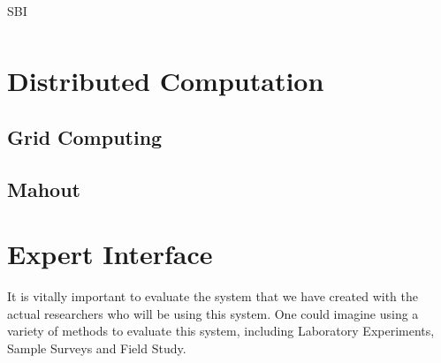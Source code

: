 \documentclass[12pt,oneside]{book}
\begin{document}
\begin{table}
\begin{tabular}{|l|l|l|}
\hline

\hline


\hline
\end{tabular}
\caption{SBI}
\label{table:obvSBI}
\end{table}

%
%




%
%





%
%





%
%




%
%





%
%





%
%









\section{Distributed Computation}




\subsection{Grid Computing}

\subsection{Mahout}



%
%

\section{Expert Interface}

It is vitally important to evaluate the system that we have created
with the actual researchers who will be using this system.  One could
imagine using a variety of methods to evaluate this system, including
Laboratory Experiments, Sample Surveys and Field Study.
\end{document}
